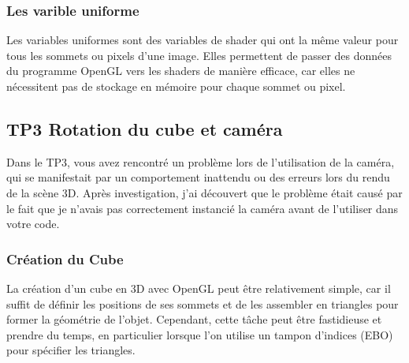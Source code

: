 \documentclass[10pt,a4paper]{article}
\begin{document}
			
		
		\subsubsection{Les varible uniforme} %
			Les variables uniformes sont des variables de shader qui ont la même valeur pour tous les sommets ou pixels d'une image. Elles permettent de passer des données du programme OpenGL vers les shaders de manière efficace, car elles ne nécessitent pas de stockage en mémoire pour chaque sommet ou pixel.
		
			

			

			

	

	\subsection{TP3 Rotation du cube et caméra} %
		Dans le TP3, vous avez rencontré un problème lors de l'utilisation de la caméra, qui se manifestait par un comportement inattendu ou des erreurs lors du rendu de la scène 3D. Après investigation, j'ai découvert que le problème était causé par le fait que je n'avais pas correctement instancié la caméra avant de l'utiliser dans votre code.

		\subsubsection{Création du Cube} %
			La création d'un cube en 3D avec OpenGL peut être relativement simple, car il suffit de définir les positions de ses sommets et de les assembler en triangles pour former la géométrie de l'objet. Cependant, cette tâche peut être fastidieuse et prendre du temps, en particulier lorsque l'on utilise un tampon d'indices (EBO) pour spécifier les triangles.
\end{document}
